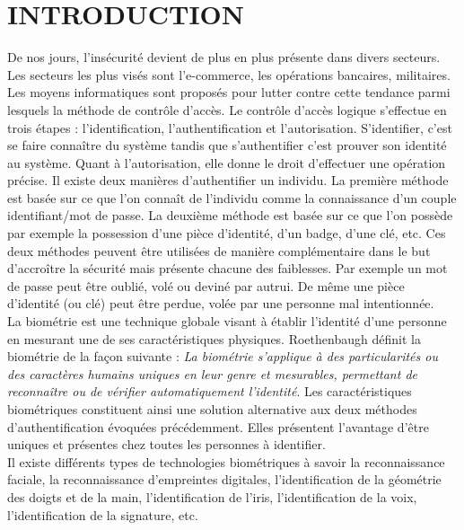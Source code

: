 


 
\chapter*{INTRODUCTION}
\renewcommand{\thepage}{\arabic{page}}
\setcounter{page}{1}
De nos jours, l'insécurité devient de plus en plus présente dans divers secteurs. Les secteurs les plus visés sont l'e-commerce, les opérations bancaires, militaires. Les moyens informatiques sont proposés pour lutter contre cette tendance parmi lesquels la méthode de contrôle d'accès. Le contrôle d'accès logique s'effectue en trois étapes : l'identification, l'authentification et l'autorisation. S'identifier, c'est se faire connaître du système tandis que s'authentifier c'est prouver son identité au système. Quant à l'autorisation, elle donne le droit d'effectuer une opération précise. Il existe deux manières d'authentifier un individu. La première méthode est basée sur \og ce que l'on connaît\fg{} de l'individu comme la connaissance d'un couple identifiant/mot de passe. La deuxième méthode est basée sur \og ce que l'on possède \fg{} par exemple la possession d'une pièce d'identité, d'un badge, d'une clé, etc. Ces deux méthodes peuvent être utilisées de manière complémentaire dans le but d'accroître la sécurité mais présente chacune des faiblesses. Par exemple un mot de passe peut être oublié, volé ou deviné par autrui. De même une pièce d'identité (ou clé) peut être perdue, volée par une personne mal intentionnée.\\

\hspace*{10pt}La biométrie est une technique globale visant à établir l'identité d'une personne en mesurant une de ses caractéristiques physiques. Roethenbaugh \citep{Roe12} définit la biométrie de la façon suivante : \og \textit{La  biométrie  s'applique à des particularités ou des caractères humains uniques en leur genre et mesurables, permettant de reconnaître ou de vérifier automatiquement l'identité}\fg{}. Les caractéristiques biométriques constituent ainsi une solution alternative aux deux méthodes d'authentification évoquées précédemment. Elles présentent l'avantage d'être uniques et présentes chez toutes les personnes à identifier.\\

\hspace*{10pt}Il existe différents types de technologies biométriques à savoir la reconnaissance faciale, la reconnaissance d'empreintes digitales, l'identification de la géométrie des doigts et de la main, l'identification de l'iris, l'identification de la voix, l'identification de la signature, etc.\\


